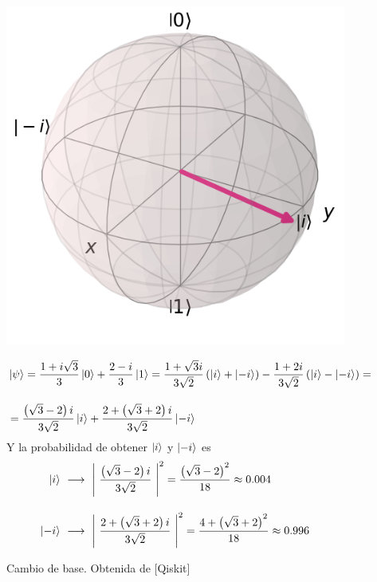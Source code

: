 \documentclass[12pt]{article}
\numberwithin{equation}{section} %
\begin{document}
    \begin{figure}[h!]
        \centering
        \begin{minipage}{0.3\textwidth}
            \includegraphics[width=\textwidth]{img/Bloch/bloch_change_basis_example_2.png}  
        \end{minipage}
        \hfill
        \begin{minipage}{0.65\textwidth}
            \begin{align*}
                &\ket{\psi} = \frac{1 + i \sqrt{3}}{3} \ket{0} + \frac{2 - i}{3} \ket{1} = \frac{1 + \sqrt{3}i}{3 \sqrt{2}} \left( \ket{i} + \ket{-i} \right) - \frac{1 + 2i}{3 \sqrt{2}} \left( \ket{i} - \ket{-i} \right) = \\[10pt]
                &=  \frac{\left( \sqrt{3} - 2 \right)i}{3 \sqrt{2}} \ket{i} + \frac{2 + \left( \sqrt{3} + 2 \right) i}{3 \sqrt{2}} \ket{-i}
            \end{align*}
            Y la probabilidad de obtener \( \ket{i} \) y \( \ket{-i} \) es
            \begin{align*}
                \ket{i} \ &\longrightarrow \ \left| \ \frac{\left( \sqrt{3} - 2 \right) i}{3 \sqrt{2}} \ \right| ^ {2} = \frac{\left( \sqrt{3} - 2 \right) ^ {2}}{18} \approx 0.004 \\[10pt]
                \ket{-i} \ &\longrightarrow \ \left| \ \frac{2 + \left( \sqrt{3} + 2 \right) i}{3 \sqrt{2}} \ \right| ^ {2} = \frac{4 + \left( \sqrt{3} + 2 \right) ^ {2}}{18} \approx 0.996
            \end{align*}
        \end{minipage}
        \caption{Cambio de base. Obtenida de [Qiskit]}\label{fig: bloch_ejemplo_medicion_3} 
    \end{figure}
\end{document}
